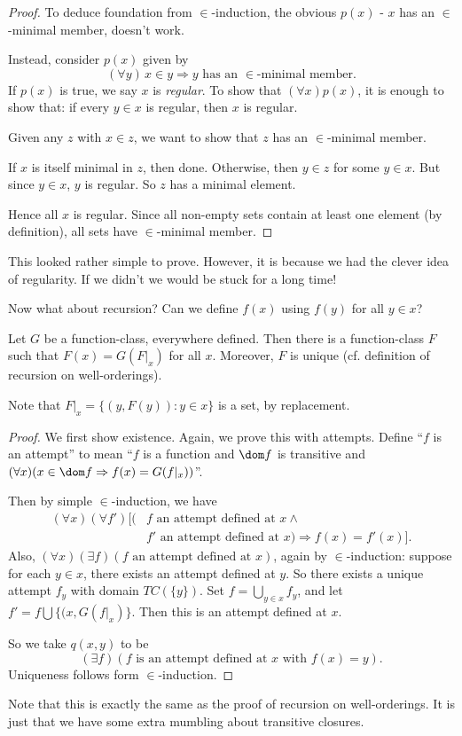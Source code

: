 \documentclass[a4paper]{article}
\begin{document}
\begin{proof}
  To deduce foundation from $\in$-induction, the obvious $p(x)$ - $x$ has an $\in$-minimal member, doesn't work.

  Instead, consider $p(x)$ given by
  \[
    (\forall y)\,x\in y \Rightarrow y\text{ has an }\in\text{-minimal member}.
  \]
  If $p(x)$ is true, we say $x$ is \emph{regular}. To show that $(\forall x)p(x)$, it is enough to show that: if every $y\in x$ is regular, then $x$ is regular.

  Given any $z$ with $x\in z$, we want to show that $z$ has an $\in$-minimal member.

  If $x$ is itself minimal in $z$, then done. Otherwise, then $y\in z$ for some $y\in x$. But since $y\in x$, $y$ is regular. So $z$ has a minimal element.

  Hence all $x$ is regular. Since all non-empty sets contain at least one element (by definition), all sets have $\in$-minimal member.
\end{proof}
This looked rather simple to prove. However, it is because we had the clever idea of regularity. If we didn't we would be stuck for a long time!

Now what about recursion? Can we define $f(x)$ using $f(y)$ for all $y\in x$?

\begin{thm}
  Let $G$ be a function-class, everywhere defined. Then there is a function-class $F$ such that $F(x) = G(F|_x)$ for all $x$. Moreover, $F$ is unique (cf. definition of recursion on well-orderings).
\end{thm}
Note that $F|_x = \{(y, F(y)): y\in x\}$ is a set, by replacement.

\begin{proof}
  We first show existence. Again, we prove this with attempts. Define ``$f$ is an attempt'' to mean ``$f$ is a function and $\dom f$ is transitive and $(\forall x)(x\in \dom f \Rightarrow  f(x) = G(f|_x))$''.

  Then by simple $\in$-induction, we have
  \begin{align*}
    (\forall x)(\forall f')[(&f\text{ an attempt defined at }x\wedge\\
    & f'\text{ an attempt defined at $x$}) \Rightarrow f(x) = f'(x)].
  \end{align*}
  Also, $(\forall x)(\exists f)(f\text{ an attempt defined at }x)$, again by $\in$-induction: suppose for each $y\in x$, there exists an attempt defined at $y$. So there exists a unique attempt $f_y$ with domain $TC(\{y\})$. Set $f = \bigcup_{y\in x}f_y$, and let $f' = f\bigcup \{(x, G(f|_x)\}$. Then this is an attempt defined at $x$.

  So we take $q(x, y)$ to be
  \[
    (\exists f)(f\text{ is an attempt defined at }x\text{ with }f(x) = y).
  \]
  Uniqueness follows form $\in$-induction.
\end{proof}
Note that this is exactly the same as the proof of recursion on well-orderings. It is just that we have some extra mumbling about transitive closures.
\end{document}
